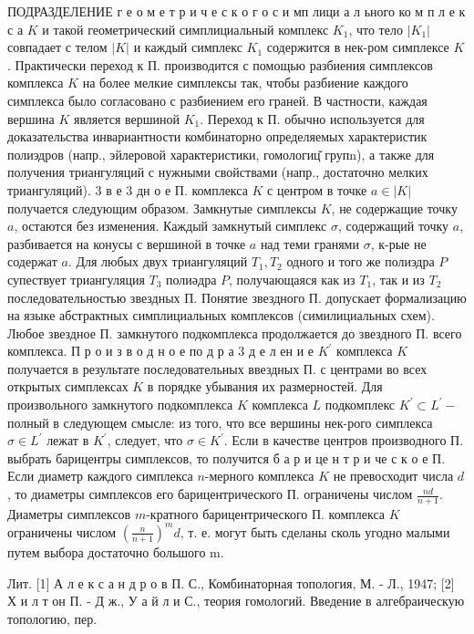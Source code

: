 \documentclass[10pt]{article}
\begin{document}
ПОДРАЗДЕЛЕНИЕ $г$ е о м е т р и ч е с к о г о с и мп лици а л ьного ко м п л е к с а $K$ и такой геометрический симплициальный комплекс $K_{1}$, что тело $\left|K_{1}\right|$ совпадает с телом $|K|$ и каждый симплекс $K_{1}$ содержится в нек-ром симплексе $K$. Практически переход к П. производится с помощью разбиения симплексов комплекса $K$ на более мелкие симплексы так, чтобы разбиение каждого симплекса было согласовано с разбиением его граней. В частности, каждая вершина $K$ является вершиной $K_{1}$. Переход к П. обычно используется для доказательства инвариантности комбинаторно определяемых характеристик полиэдров (напр., эйлеровой характеристики, гомологиц̆ групn), а также для получения триангуляций с нужными свойствами (напр., достаточно мелких триангуляций). 3 в е 3 дн о е П. комплекса $K$ с центром в точке $a \in|K|$ получается следующим образом. Замкнутые симплексы $K$, не содержащие точку $a$, остаются без изменения. Каждый замкнутый симплекс $\sigma$, содержащий точку $a$, разбивается на конусы с вершиной в точке $a$ над теми гранями $\sigma$, к-рые не содержат $a$. Для любых двух триангуляций $T_{1}, T_{2}$ одного и того же полиэдра $P$ супествует триангуляция $T_{3}$ полиәдра $P$, получающаяся как из $T_{1}$, так и из $T_{2}$ последовательностью звездных П. Понятие звездного П. допускает формализацию на языке абстрактных симплициальных комплексов (симилициальных схем). Любое звездное П. замкнутого подкомплекса продолжается до звездного П. всего комплекса. П р о и з в о д н о е по д р а 3 д е л ен и е $K^{\prime}$ комплекса $K$ получается в результате последовательных ввездных П. с центрами во всех открытых симплексах $K$ в порядке убывания их размерностей. Для произвольного замкнутого подкомплекса $K$ комплекса $L$ подкомплекс $K^{\prime} \subset L^{\prime}-$ полный в следующем смысле: из того, что все вершины нек-рого симплекса $\sigma \in L^{\prime}$ лежат в $K^{\prime}$, следует, что $\sigma \in K^{\prime}$. Если в качестве центров производного П. выбрать барицентры симплексов, то получится б а р и це н т р и че с к о е П. Если диаметр каждого симплекса $n$-мерного комплекса $K$ не превосходит числа $d$, то диаметры симплексов его барицентрического П. ограничены числом $\frac{n d}{n+1}$. Диаметры симплексов $m$-кратного барицентрического П. комплекса $K$ ограничены числом $\left(\frac{n}{n+1}\right)^{m} d$, т. е. могут быть сделаны сколь угодно малыми путем выбора достаточно большого $\mathrm{m}$.



Лит. [1] А л е к с а н д р о в П. С., Комбинаторная топология, М. - Л., 1947; [2] Х и л т он П. - Д ж., У а й л и С., теория гомологий. Введение в алгебраическую топологию, пер.
\end{document}
